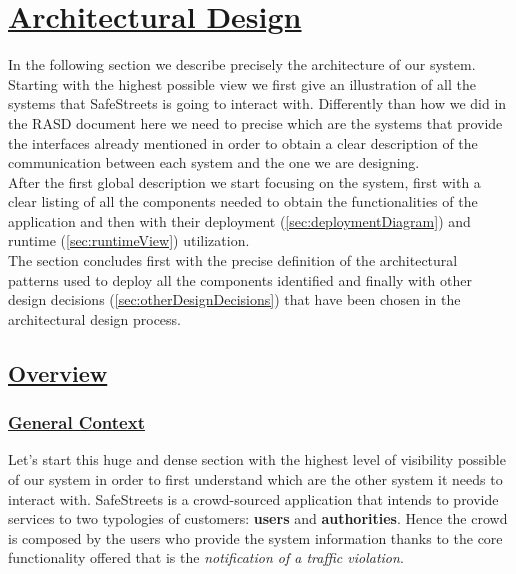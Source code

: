 \section[Architectural Design]{\hyperlink{toc}{Architectural Design}}
	\label{sec:architecturalDesign}
	
	In the following section we describe precisely the architecture of our system. Starting with the highest possible view we first give an illustration of all the systems that SafeStreets is going to interact with. Differently than how we did in the RASD \cite{RASD} document here we need to precise which are the systems that provide the interfaces already mentioned in order to obtain a clear description of the communication between each system and the one we are designing.\\
	
	After the first global description we start focusing on the system, first with a clear listing of all the components needed to obtain the functionalities of the application and then with their deployment (\ref{sec:deploymentDiagram}) and runtime (\ref{sec:runtimeView}) utilization.\\
	
	The section concludes first with the precise definition of the architectural patterns used to deploy all the components identified and finally with other design decisions (\ref{sec:otherDesignDecisions}) that have been chosen in the architectural design process.	
	
	\subsection[Overview]{\hyperlink{toc}{Overview}}
		\label{sec:overview}
		
		\subsubsection[General Context]{\hyperlink{toc}{General Context}}
			\label{sec:generalContext}
			
			Let's start this huge and dense section with the highest level of visibility possible of our system in order to first understand which are the other system it needs to interact with. SafeStreets is a crowd-sourced application that intends to provide services to two typologies of customers: \textbf{users} and \textbf{authorities}. Hence the crowd is composed by the users who provide the system information thanks to the core functionality offered that is the \emph{notification of a traffic violation}.\\
			
